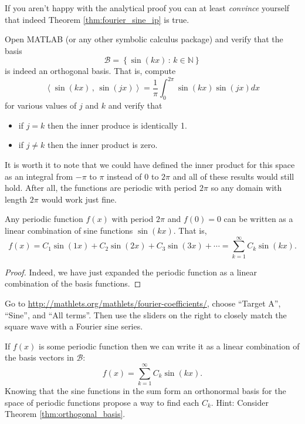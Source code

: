 If you aren't happy with the analytical proof you can at least {\it convince} yourself
that indeed Theorem \ref{thm:fourier_sine_ip} is true.
\begin{problem}
    Open MATLAB (or any other symbolic calculus package) and verify that the basis
\[ \mathcal{B} = \left\{ \sin\left( k x\right) \, : \, k \in \mathbb{N} \right\} \]
    is indeed an orthogonal basis.  That is, compute 
    \[ \left< \sin\left( k x\right) \, , \, \sin\left( j x \right)
        \right> =  \frac{1}{\pi} \int_0^{2\pi} \sin\left( k x\right) \sin\left( j x\right) dx \]
    for various values of $j$ and $k$ and verify that 
    \begin{itemize}
        \item if $j=k$ then the inner produce is identically 1.
        \item if $j \neq k$ then the inner product is zero.
    \end{itemize}
\end{problem}

It is worth it to note that we could have defined the inner product for this space as an
integral from $-\pi$ to $\pi$ instead of $0$ to $2\pi$ and all of these results would
still hold.  After all, the functions are periodic with period $2\pi$ so any domain with
length $2\pi$ would work just fine.

\begin{thm}
    Any periodic function $f(x)$ with period $2\pi$ and $f(0) = 0$ can be written as a
    linear combination of sine functions $\sin(kx)$.  That is,
    \[ f(x) = C_1 \sin(1x) + C_2 \sin(2x) + C_3 \sin(3x) + \cdots = \sum_{k=1}^\infty C_k
    \sin(kx). \]
\end{thm}
\begin{proof}
    Indeed, we have just expanded the periodic function as a linear combination of the
    basis functions.
\end{proof}

\begin{problem}
    Go to
    \href{http://mathlets.org/mathlets/fourier-coefficients/}{http://mathlets.org/mathlets/fourier-coefficients/},
    choose ``Target A'', ``Sine'', and ``All terms''.  Then use the sliders on the right
    to closely match the square wave with a Fourier sine series.
\end{problem}

\begin{problem}
    If $f(x)$ is some periodic function then we can write it as a linear combination of
    the basis vectors in $\mathcal{B}$:
    \[ f(x) = \sum_{k=1}^{\infty} C_k \sin(k x). \]
    Knowing that the sine functions in the sum form an orthonormal basis for the space of
    periodic functions propose a way to find each $C_k$.  Hint: Consider Theorem
    \ref{thm:orthogonal_basis}.
\end{problem}


